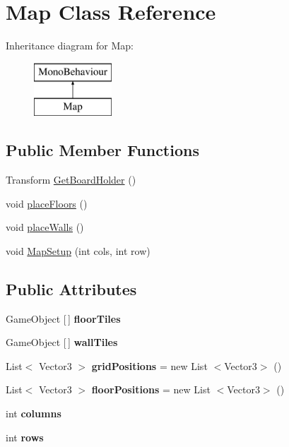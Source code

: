 \hypertarget{class_map}{}\section{Map Class Reference}
\label{class_map}
Inheritance diagram for Map\+:\begin{figure}[H]
\begin{center}
\leavevmode
\includegraphics[height=2.000000cm]{class_map}
\end{center}
\end{figure}
\subsection*{Public Member Functions}
\begin{DoxyCompactItemize}
\item 
Transform \mbox{\hyperlink{class_map_a65f298678747e49b6f99ba46271e2519}{Get\+Board\+Holder}} ()
\item 
void \mbox{\hyperlink{class_map_a4b4925269b22d09fc07109d19f8c32e6}{place\+Floors}} ()
\item 
void \mbox{\hyperlink{class_map_a861230d1abdb5ed46e9dc95e8bf61d41}{place\+Walls}} ()
\item 
void \mbox{\hyperlink{class_map_a61d3bb5dbaec40d06efb1b29539f3d2f}{Map\+Setup}} (int cols, int row)
\end{DoxyCompactItemize}
\subsection*{Public Attributes}
\begin{DoxyCompactItemize}
\item 
\mbox{\label{class_map_a284e57bb463795f868d0004f2c91ce34}} 
Game\+Object \mbox{[}$\,$\mbox{]} {\bfseries floor\+Tiles}
\item 
\mbox{\label{class_map_abc75d741038130d7b274d5eab51758c1}} 
Game\+Object \mbox{[}$\,$\mbox{]} {\bfseries wall\+Tiles}
\item 
\mbox{\label{class_map_a9be8c4808419f525ab5452f1b074c90f}} 
List$<$ Vector3 $>$ {\bfseries grid\+Positions} = new List $<$Vector3$>$ ()
\item 
\mbox{\label{class_map_a4a5808c38dec273b158a81a6af47e5f5}} 
List$<$ Vector3 $>$ {\bfseries floor\+Positions} = new List $<$Vector3$>$ ()
\item 
\mbox{\label{class_map_a86f5dc6f831600a856ee693454bdf308}} 
int {\bfseries columns}
\item 
\mbox{\label{class_map_a4c6ba6b1a6ba20821550e6dd8f8cefbe}} 
int {\bfseries rows}
\end{DoxyCompactItemize}


